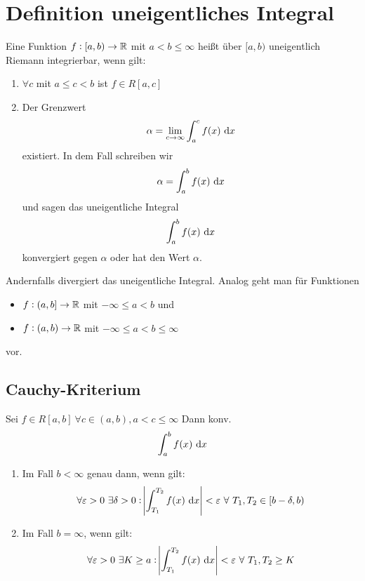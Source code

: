 \section{Definition uneigentliches Integral}
Eine Funktion $f: [a, b) \rightarrow \mathbb{R}$ mit $a < b \leq \infty$ heißt über
$[a,b)$ uneigentlich Riemann integrierbar, wenn gilt:
\begin{enumerate}[label= (\alph*)]
    \item $\forall c$ mit $a \leq c < b$ ist $f \in R[a, c]$
    \item Der Grenzwert
        \begin{equation*}
            \alpha = \lim_{c \rightarrow \infty} \int_a^c f(x) \text{ d}x
        \end{equation*}
        existiert. In dem Fall schreiben wir
        \begin{equation*}
            \alpha = \int_a^b f(x) \text{ d}x
        \end{equation*}
        und sagen das uneigentliche Integral
        \begin{equation*}
            \int_a^b f(x) \text{ d}x
        \end{equation*}
        konvergiert gegen $\alpha$ oder hat den Wert $\alpha$.
\end{enumerate}

Andernfalls divergiert das uneigentliche Integral.
Analog geht man für Funktionen
\begin{itemize}
    \item $f: (a, b] \rightarrow \mathbb{R}$ mit $-\infty \leq a < b$ und
    \item $f: (a, b) \rightarrow \mathbb{R}$ mit $-\infty \leq a < b \leq \infty$
\end{itemize}
vor.

\subsection{Cauchy-Kriterium}
Sei $f \in R[a,b]\ \forall c \in (a,b), a < c \leq \infty$ Dann konv.
\begin{equation*}
    \int_a^b f(x) \text{ d}x
\end{equation*}
\begin{enumerate}[label= (\alph*)]
    \item Im Fall $b<\infty$ genau dann, wenn gilt:
        \begin{equation*}
            \forall \varepsilon > 0\ \exists \delta > 0: \abs{\int_{T_1}^{T_2} f(x) \text{ d}x} < \varepsilon\ \forall~T_1, T_2 \in [b - \delta, b)
        \end{equation*}
    \item Im Fall $b = \infty$, wenn gilt:
        \begin{equation*}
                \forall \varepsilon > 0\ \exists K \geq a: \abs{\int_{T_1}^{T_2} f(x) \dx} < \varepsilon\ \forall~T_1, T_2 \geq K
        \end{equation*}
\end{enumerate}
